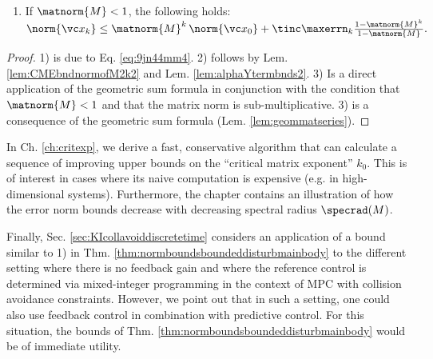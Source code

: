 \begin{thm}
\begin{enumerate}
\item If $\matnorm{M} < 1$, the following holds:
$\norm{\vc x_k} \leq \matnorm{M}^{k} \, \norm{\vc x_0} + \tinc \maxerrn_{k}   \frac{1-\matnorm{M}^k}{1-\matnorm{M}}. $
	\end{enumerate}
\begin{proof}
1) is due to Eq. \ref{eq:9jn44mm4}. 2) follows by Lem. \ref{lem:CMEbndnormofM2k2}  and  Lem. \ref{lem:alphaYtermbnds2}. 3) Is a direct application of the geometric sum formula in conjunction with the condition that $\matnorm{M}<1$ and that the matrix norm is sub-multiplicative. 3) is a consequence of the geometric sum formula (Lem. \ref{lem:geommatseries}). 
\end{proof}	
\end{thm}


In Ch. \ref{ch:critexp}, we derive a fast, conservative algorithm that can calculate a sequence of improving upper bounds on the ``critical matrix exponent'' $k_0$. This is of interest in cases where its naive computation is expensive (e.g. in high-dimensional systems). Furthermore, the chapter contains an illustration of how the error norm bounds decrease with decreasing spectral radius $\specrad(M)$.

Finally, Sec. \ref{sec:KIcollavoiddiscretetime} considers an application of a bound similar to 1) in Thm. \ref{thm:normboundsboundeddisturbmainbody} to the different setting where there is no feedback gain and where the reference control is determined via mixed-integer programming in the context of MPC with collision avoidance constraints. However, we point out that in such a setting, one could also use feedback control in combination with predictive control. For this situation, the bounds of Thm. \ref{thm:normboundsboundeddisturbmainbody} would be of immediate utility.


  